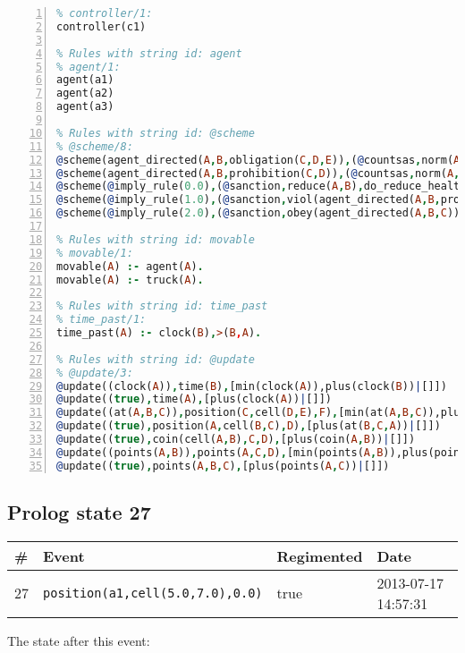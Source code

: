 \documentclass[11pt]{article}\usepackage[utf8]{inputenc}\usepackage{geometry}
\begin{document}
\begin{lstlisting}[language=Prolog, numbers=left]
% Rules with string id: controller
% controller/1:
controller(c1)

% Rules with string id: agent
% agent/1:
agent(a1)
agent(a2)
agent(a3)

% Rules with string id: @scheme
% @scheme/8:
@scheme(agent_directed(A,B,obligation(C,D,E)),(@countsas,norm(A,B,F,obligation(C,D,E)),F),false,(listTrue(C)),(time_past(D)),false,[plus(viol(agent_directed(A,B,obligation(C,D,E))))|[]],[plus(obey(agent_directed(A,B,obligation(C,D,E))))|[]])
@scheme(agent_directed(A,B,prohibition(C,D)),(@countsas,norm(A,B,E,prohibition(C,D)),E),(listTrue(C)),false,(false),false,[plus(viol(agent_directed(A,B,prohibition(C,D))))|[]],[plus(obey(agent_directed(A,B,prohibition(C,D))))|[]])
@scheme(@imply_rule(0.0),(@sanction,reduce(A,B),do_reduce_health(A,B),notifyAgent(A,changed(status))),true,false,false,false,[min(reduce(A,B))|[]],[])
@scheme(@imply_rule(1.0),(@sanction,viol(agent_directed(A,B,prohibition(C,D))),do_sanction(D)),true,false,false,false,[min(viol(agent_directed(A,B,prohibition(C,D))))|[]],[])
@scheme(@imply_rule(2.0),(@sanction,obey(agent_directed(A,B,C))),true,false,false,false,[min(obey(agent_directed(A,B,C)))|[]],[])

% Rules with string id: movable
% movable/1:
movable(A) :- agent(A).
movable(A) :- truck(A).

% Rules with string id: time_past
% time_past/1:
time_past(A) :- clock(B),>(B,A).

% Rules with string id: @update
% @update/3:
@update((clock(A)),time(B),[min(clock(A)),plus(clock(B))|[]])
@update((true),time(A),[plus(clock(A))|[]])
@update((at(A,B,C)),position(C,cell(D,E),F),[min(at(A,B,C)),plus(at(D,E,C))|[]])
@update((true),position(A,cell(B,C),D),[plus(at(B,C,A))|[]])
@update((true),coin(cell(A,B),C,D),[plus(coin(A,B))|[]])
@update((points(A,B)),points(A,C,D),[min(points(A,B)),plus(points(A,D))|[]])
@update((true),points(A,B,C),[plus(points(A,C))|[]])

\end{lstlisting}
\clearpage 
\subsection{Prolog state 27}
\begin{table}[ht]
\centering 
\begin{tabular}{l l l l} 
\textbf{\#} & \textbf{Event} & \textbf{Regimented} & \textbf{Date} \\ [0.5ex] 
\hline
27&\texttt{position(a1,cell(5.0,7.0),0.0)}&true&2013-07-17 14:57:31\\ [1ex] \hline\end{tabular}
\end{table}
The state after this event:
\end{document}
